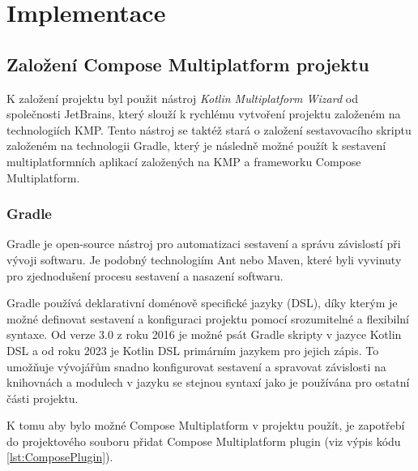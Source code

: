 \chapter{Implementace}


\section{Založení Compose Multiplatform projektu}
K založení projektu byl použit nástroj \textit{Kotlin Multiplatform Wizard} od společnosti JetBrains, který slouží k rychlému vytvoření projektu
založeném na technologiích KMP. Tento nástroj se taktéž stará o založení sestavovacího skriptu založeném na technologii Gradle, který je následně možné 
použít k sestavení multiplatformních aplikací založených na KMP a frameworku Compose Multiplatform.
 
 



%

\subsection{Gradle} \label{gradleChapter}
Gradle je open-source nástroj pro automatizaci sestavení a správu závislostí při vývoji softwaru. Je 
podobný technologiím Ant nebo Maven, které byli vyvinuty pro zjednodušení procesu sestavení a nasazení softwaru.

Gradle používá deklarativní doménově specifické jazyky (DSL), díky kterým je možné definovat sestavení a konfiguraci projektu pomocí srozumitelné
a flexibilní syntaxe. Od verze 3.0 z roku 2016 je možné psát Gradle skripty v jazyce Kotlin DSL a od roku 2023 je Kotlin DSL primárním jazykem 
pro jejich zápis. To umožňuje vývojářům snadno konfigurovat sestavení a spravovat závislosti na knihovnách a modulech v jazyku se stejnou
syntaxí jako je používána pro ostatní části projektu. 



K tomu aby bylo možné Compose Multiplatform v projektu použít, je zapotřebí do projektového souboru  přidat Compose 
Multiplatform plugin (viz výpis kódu \ref{lst:ComposePlugin}).


